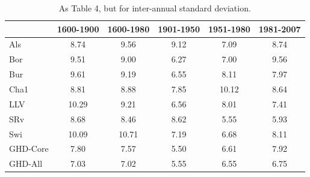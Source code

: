 \documentclass[12pt]{article}
\begin{document}
\begin{table}
\small
\caption{\small As Table 4, but for inter-annual standard deviation.}
\centering
\begin{tabular}{l c c c c c}
\hline
& \bf 1600-1900 & \bf 1600-1980 & \bf 1901-1950 & \bf 1951-1980 & \bf 1981-2007\\
\hline
Als	& 8.74	& 9.56	& 9.12	& 7.09	& 8.74\\
Bor	& 9.51	& 9.00	& 6.27	& 7.00	& 9.56\\
Bur	& 9.61 & 9.19 & 6.55 & 8.11 & 7.97\\
Cha1 & 8.81 & 8.88 & 7.85 & 10.12 & 8.64\\
LLV	& 10.29 & 9.21 & 6.56 & 8.01 & 7.41\\
SRv & 8.68 & 8.46 & 8.62 & 5.55 & 5.93\\
Swi	& 10.09	& 10.71	& 7.19	& 6.68	& 8.11\\
\hline
GHD-Core & 7.80 & 7.57	& 5.50	& 6.61	& 7.92\\
GHD-All	& 7.03 & 7.02 & 5.55 & 6.55 & 6.75\\
\hline
\end{tabular}
\end{table}


\pagebreak

\renewcommand{\figurename}{Supplementary Figure}
\setcounter{figure}{0}
\end{document}
